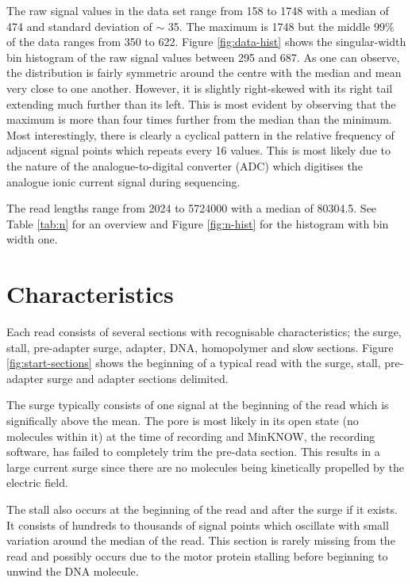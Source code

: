 The raw signal values in the data set range from 158 to 1748 with a median of 474 and standard deviation of $\sim$ 35. The maximum is 1748 but the middle 99\% of the data ranges from 350 to 622. Figure \ref{fig:data-hist} shows the singular-width bin histogram of the raw signal values between 295 and 687.
As one can observe, the distribution is fairly symmetric around the centre with the median and mean very close to one another. However, it is slightly right-skewed with its right tail extending much further than its left. This is most evident by observing that the maximum is more than four times further from the median than the minimum.
Most interestingly, there is clearly a cyclical pattern in the relative frequency of adjacent signal points which repeats every 16 values.
This is most likely due to the nature of the analogue-to-digital converter (ADC) which digitises the analogue ionic current signal during sequencing.




The read lengths range from 2024 to \num{5724000} with a median of 80304.5. See Table \ref{tab:n} for an overview and Figure \ref{fig:n-hist} for the histogram with bin width one.






\section{Characteristics}

Each read consists of several sections with recognisable characteristics; the surge, stall, pre-adapter surge, adapter, DNA, homopolymer and slow sections. Figure \ref{fig:start-sections} shows the beginning of a typical read with the surge, stall, pre-adapter surge and adapter sections delimited.

The surge typically consists of one signal at the beginning of the read which is significally above the mean. The pore is most likely in its open state (no molecules within it) at the time of recording and MinKNOW, the recording software, has failed to completely trim the pre-data section. This results in a large current surge since there are no molecules being kinetically propelled by the electric field.

The stall also occurs at the beginning of the read and after the surge if it exists. It consists of hundreds to thousands of signal points which oscillate with small variation around the median of the read. This section is rarely missing from the read and possibly occurs due to the motor protein stalling before beginning to unwind the DNA molecule.


